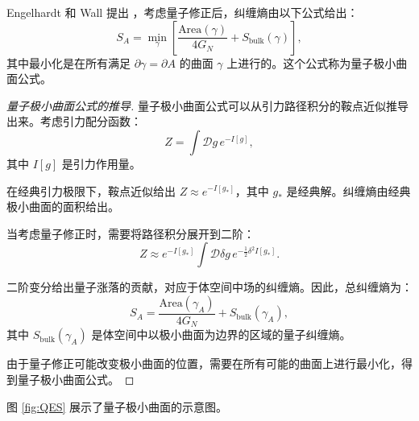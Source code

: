 \begin{theorem}[量子极小曲面公式] \label{thm:QES}
Engelhardt 和 Wall 提出 \cite{Engelhardt2015}，考虑量子修正后，纠缠熵由以下公式给出：
\begin{equation}
    S_A = \min_{\gamma} \left[ \frac{\text{Area}(\gamma)}{4G_N} + S_{\text{bulk}}(\gamma) \right],
    \label{eq:QES}
\end{equation}
其中最小化是在所有满足 $\partial \gamma = \partial A$ 的曲面 $\gamma$ 上进行的。这个公式称为量子极小曲面公式。
\end{theorem}

\begin{proof}[量子极小曲面公式的推导]
量子极小曲面公式可以从引力路径积分的鞍点近似推导出来。考虑引力配分函数：
\begin{equation}
    Z = \int \mathcal{D}g \, e^{-I[g]},
\end{equation}
其中 $I[g]$ 是引力作用量。

在经典引力极限下，鞍点近似给出 $Z \approx e^{-I[g_*]}$，其中 $g_*$ 是经典解。纠缠熵由经典极小曲面的面积给出。

当考虑量子修正时，需要将路径积分展开到二阶：
\begin{equation}
    Z \approx e^{-I[g_*]} \int \mathcal{D}\delta g \, e^{-\frac{1}{2} \delta^2 I[g_*]}.
\end{equation}

二阶变分给出量子涨落的贡献，对应于体空间中场的纠缠熵。因此，总纠缠熵为：
\begin{equation}
    S_A = \frac{\text{Area}(\gamma_A)}{4G_N} + S_{\text{bulk}}(\gamma_A),
\end{equation}
其中 $S_{\text{bulk}}(\gamma_A)$ 是体空间中以极小曲面为边界的区域的量子纠缠熵。

由于量子修正可能改变极小曲面的位置，需要在所有可能的曲面上进行最小化，得到量子极小曲面公式。
\end{proof}

图 \ref{fig:QES} 展示了量子极小曲面的示意图。

